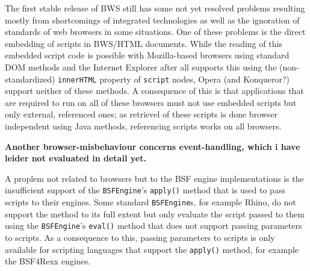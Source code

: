 The first stable release of BWS still has some not yet resolved problems resulting mostly from shortcomings of integrated technologies as well as the ignoration of standards of web browsers in some situations. One of these problems is the direct embedding of scripts in BWS/HTML documents. While the reading of this embedded script code is possible with Mozilla-based browsers using standard DOM methods and the Internet Explorer after all supports this using the (non-standardized) \texttt{innerHTML} property of \texttt{script} nodes, Opera (and Konqueror?) support neither of these methods. A consequence of this is that applications that are required to run on all of these browsers must not use embedded scripts but only external, referenced ones; as retrievel of these scripts is done browser independent using Java methods, referencing scripts works on all browsers.

\textbf{Another browser-misbehaviour concerns event-handling, which i have leider not evaluated in detail yet.}

A proplem not related to browsers but to the BSF engine implementations is the insufficient support of the \texttt{BSFEngine}'s \texttt{apply()} method that is used to pass scripts to their engines. Some standard \texttt{BSFEngine}s, for example Rhino, do not support the method to its full extent but only evaluate the script passed to them using the \texttt{BSFEngine}'s \texttt{eval()} method that does not support passing parameters to scripts. As a consequence to this, passing parameters to scripts is only available for scripting languages that support the \texttt{apply()} method, for example the BSF4Rexx engines.


